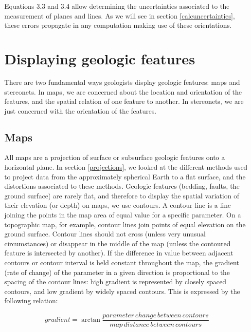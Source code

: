 \documentclass[a4paper , 12pt]{book}
\begin{document}
Equations 3.3 and 3.4 allow determining the uncertainties associated to the measurement of planes and lines. As we will see in section \ref{calcuncertainties}, these errors propagate in any computation making use of these orientations.

\section{Displaying geologic features}

There are two fundamental ways geologists display geologic features: maps and stereonets. In maps, we are concerned about the location and orientation of the features, and the spatial relation of one feature to another. In stereonets, we are just concerned with the orientation of the features.

\subsection{Maps}

All maps are a projection of surface or subsurface geologic features onto a horizontal plane. In section \ref{projections}, we looked at the different methods used to project data from the approximately spherical Earth to a flat surface, and the distortions associated to these methods. Geologic features (bedding, faults, the ground surface) are rarely flat, and therefore to display the spatial variation of their elevation (or depth) on maps, we use contours. A contour line is a line joining the points in the map area of equal value for a specific parameter. On a topographic map, for example, contour lines join points of equal elevation on the ground surface. Contour lines should not cross (unless very unusual circumstances) or disappear in the middle of the map (unless the contoured feature is intersected by another). If the difference in value between adjacent contours or contour interval is held constant throughout the map, the gradient (rate of change) of the parameter in a given direction is proportional to the spacing of the contour lines: high gradient is represented by closely spaced contours, and low gradient by widely spaced contours. This is expressed by the following relation:

\begin{equation}
    gradient = \arctan\frac{parameter\,change\,between\,contours}{map\,distance\,between\,contours} \tag{3.5a}
\end{equation}
\end{document}
